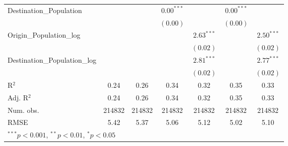 \begin{table}
\begin{center}
\begin{tabular}{l c c c c c c }
			Destination\_Population      &               &               & $0.00^{***}$  &                & $0.00^{***}$  &                \\
			&               &               & $(0.00)$      &                & $(0.00)$      &                \\
			Origin\_Population\_log      &               &               &               & $2.63^{***}$   &               & $2.50^{***}$   \\
			&               &               &               & $(0.02)$       &               & $(0.02)$       \\
			Destination\_Population\_log &               &               &               & $2.81^{***}$   &               & $2.77^{***}$   \\
			&               &               &               & $(0.02)$       &               & $(0.02)$       \\
			\hline
			R$^2$                        & 0.24          & 0.26          & 0.34          & 0.32           & 0.35          & 0.33           \\
			Adj. R$^2$                   & 0.24          & 0.26          & 0.34          & 0.32           & 0.35          & 0.33           \\
			Num. obs.                    & 214832        & 214832        & 214832        & 214832         & 214832        & 214832         \\
			RMSE                         & 5.42          & 5.37          & 5.06          & 5.12           & 5.02          & 5.10           \\
			\hline
			\multicolumn{7}{l}{\scriptsize{$^{***}p<0.001$, $^{**}p<0.01$, $^*p<0.05$}}
		\end{tabular}
		\label{table:GravityModel2015Q4}
	\end{center}
\end{table}


